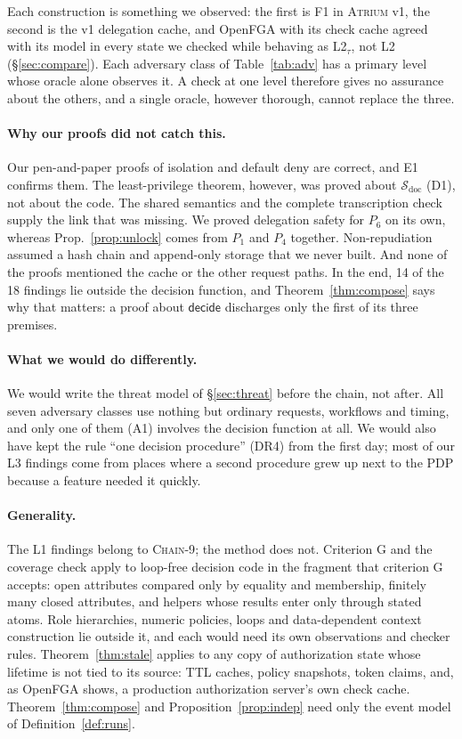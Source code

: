 \documentclass[sigconf,review,anonymous]{acmart}
\newcommand{\sysname}{\textsc{Atrium}\xspace}
\newcommand{\sysname}{\textsc{OpenZTAC}\xspace}
\newcommand{\chain}{\textsc{Chain-9}\xspace}
\newcommand{\decide}{\mathsf{decide}}
\begin{document}
Each construction is something we observed: the first is F1 in \sysname v1, the second is the v1 delegation
cache, and OpenFGA with its check cache agreed with its model in every state we checked while behaving as
L2$_\tau$, not L2 (\S\ref{sec:compare}). Each
adversary class of Table~\ref{tab:adv} has a primary level whose oracle alone observes it. A check at one level
therefore gives no assurance about the others, and a single oracle, however thorough, cannot replace the three.

\paragraph{Why our proofs did not catch this.} Our pen-and-paper proofs of isolation and default deny are
correct, and E1 confirms them. The least-privilege theorem, however, was proved about $\mathcal{S}_{\mathrm{doc}}$
(D1), not about the code. The shared semantics and the complete transcription check supply the link that
was missing. We proved delegation safety for $P_6$ on its own, whereas Prop.~\ref{prop:unlock} comes from $P_1$ and
$P_4$ together. Non-repudiation assumed a hash chain and append-only storage that we never built. And none of the
proofs mentioned the cache or the other request paths. In the end, 14 of the 18 findings lie outside the decision
function, and Theorem~\ref{thm:compose} says why that matters: a proof about $\decide$ discharges only the first of
its three premises.

\paragraph{What we would do differently.} We would write the threat model of \S\ref{sec:threat} before the
chain, not after. All seven adversary classes use nothing but ordinary requests, workflows and timing, and only
one of them (A1) involves the decision function at all. We would also have kept the rule ``one decision procedure''
(DR4) from the first day; most of our L3 findings come from places where a second procedure grew up next to the
PDP because a feature needed it quickly.

\paragraph{Generality.} The L1 findings belong to \chain; the method does not. Criterion G and the coverage check
apply to loop-free decision code in the fragment that criterion G accepts: open attributes compared only by
equality and membership, finitely many closed attributes, and helpers whose results enter only through stated
atoms. Role hierarchies, numeric policies, loops and data-dependent context construction lie outside it, and
each would need its own observations and checker rules. Theorem~\ref{thm:stale} applies to any copy of authorization state whose lifetime is
not tied to its source: TTL caches, policy snapshots, token claims, and, as OpenFGA shows, a production
authorization server's own check cache. Theorem~\ref{thm:compose} and Proposition~\ref{prop:indep} need only the
event model of Definition~\ref{def:runs}.
\end{document}
